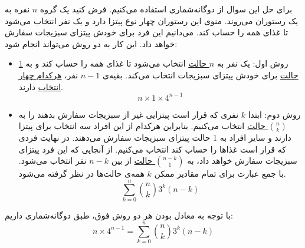 \p
برای حل این سوال از دوگانه‌شماری استفاده می‌کنیم.
فرض کنید یک گروه 
$n$ 
نفره به یک رستوران می‌روند. منوی این رستوران چهار نوع پیتزا دارد و یک نفر انتخاب می‌شود تا غذای همه را حساب کند.
می‌دانیم این فرد برای خودش پیتزای سبزیجات سفارش خواهد داد.
 این کار به دو روش می‌تواند انجام شود:
\begin{itemize}
\item 
روش اول: 
یک نفر به 
\underline{$n$ حالت}
انتخاب می‌شود تا غذای همه را حساب کند
و به 
\underline{1 حالت}
برای خودش پیتزای سبزیجات انتخاب می‌کند.  
بقیه‌ی 
$n-1$ 
نفر، 
\underline{هرکدام چهار انتخاب}
 دارند. 
$$n\times 1 \times 4^{n-1}$$

\item 
روش دوم:
ابتدا $k$ 
نفری که قرار است پیتزایی غیر از سبزیجات سفارش بدهند را به
\underline{$\binom{n}{k}$ حالت}
انتخاب می‌کنیم. 
 بنابراین هرکدام از این افراد سه انتخاب برای پیتزا دارند و
سایر افراد به 1 حالت پیتزای سبزیجات سفارش می‌دهند.
در نهایت فردی که قرار است غذاها را حساب کند انتخاب می‌کنیم.
 از آنجایی که این فرد پیتزای سبزیجات سفارش خواهد داد، به
 \underline{$\binom{n-k}{1}$ حالت}
 از بین 
 $n-k$ 
 نفر انتخاب می‌شود. با جمع عبارت برای تمام مقادیر ممکن 
 $k$ 
همه‌ی حالت‌ها در نظر گرفته می‌شود.
$$\sum\limits_{k=0}^{n} \binom{n}{k}3^k (n-k)$$
\end{itemize}

با ‌توجه به معادل بودن هر دو روش فوق، طبق دوگانه‌شماری داریم:
$$ n\times 4^{n-1} = \sum\limits_{k=0}^{n} \binom{n}{k}3^k (n-k) $$